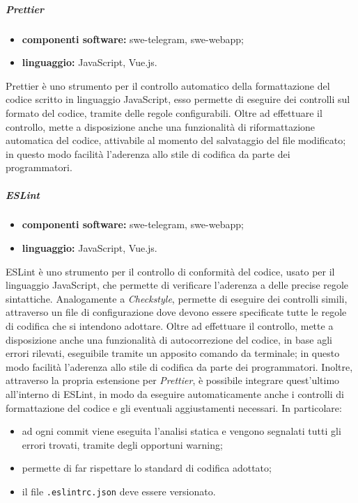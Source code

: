                 \subparagraph{Prettier}

	                \begin{itemize}
	                    \item \textbf{componenti software:} swe-telegram, swe-webapp;
	                    \item \textbf{linguaggio:} JavaScript, Vue.js.
	                \end{itemize}
	                
	                Prettier è uno strumento per il controllo automatico della formattazione del codice scritto in linguaggio JavaScript, esso permette di eseguire dei controlli sul formato del codice, tramite delle regole configurabili.
	                \newline
	                Oltre ad effettuare il controllo, mette a disposizione anche una funzionalità di riformattazione automatica del codice, attivabile al momento del salvataggio del file modificato; in questo modo facilità l'aderenza allo stile di codifica da parte dei programmatori.
				
				\subparagraph{ESLint} 
				
					\begin{itemize}
						\item \textbf{componenti software:} swe-telegram, swe-webapp;
						\item \textbf{linguaggio:} JavaScript, Vue.js.
					\end{itemize}
					
					ESLint è uno strumento per il controllo di conformità del codice, usato per il linguaggio JavaScript, che permette di verificare l'aderenza a delle precise regole sintattiche.
					\newline
					Analogamente a \textit{Checkstyle}, permette di eseguire dei controlli simili, attraverso un file di configurazione dove devono essere specificate tutte le regole di codifica che si intendono adottare.
					\newline
					Oltre ad effettuare il controllo, mette a disposizione anche una funzionalità di autocorrezione del codice, in base agli errori rilevati, eseguibile tramite un apposito comando da terminale; in questo modo facilità l'aderenza allo stile di codifica da parte dei programmatori.
					\newline
					Inoltre, attraverso la propria estensione per \textit{Prettier}, è possibile integrare quest'ultimo all'interno di ESLint, in modo da eseguire automaticamente anche i controlli di formattazione del codice e gli eventuali aggiustamenti necessari. In particolare:
					\begin{itemize}
						\item ad ogni commit viene eseguita l'analisi statica e vengono segnalati tutti gli errori trovati, tramite degli opportuni warning;
						\item permette di far rispettare lo standard di codifica adottato;
						\item il file \verb!.eslintrc.json! deve essere versionato.
					\end{itemize}
				

